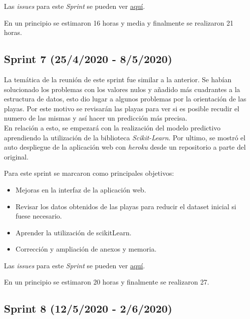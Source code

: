 Las \emph{issues} para este \emph{Sprint} se pueden ver \href{https://github.com/psnti/TFG-Pablo-Santidrian-Tudanca/milestone/6}{aquí}.


En un principio se estimaron 16 horas y media y finalmente se realizaron 21 horas.

\subsection{Sprint 7 (25/4/2020 - 8/5/2020)}\label{Sprint-7}

La temática de la reunión de este sprint fue similar a la anterior. Se habían solucionado los problemas con los valores nulos y añadido más cuadrantes a la estructura de datos, esto dio lugar a algunos problemas por la orientación de las playas. Por este motivo se revisarán las playas para ver si es posible recudir el numero de las mismas y así hacer un predicción más precisa.\\
En relación a esto, se empezará con la realización del modelo predictivo aprendiendo la utilización de la biblioteca \emph{Scikit-Learn}.
Por ultimo, se mostró el auto despliegue de la aplicación web con \emph{heroku} desde un repositorio a parte del original.

Para este sprint se marcaron como principales objetivos:
\begin{itemize}
	\item Mejoras en la interfaz de la aplicación web.
	\item Revisar los datos obtenidos de las playas para reducir el dataset inicial si fuese necesario.
	\item Aprender la utilización de scikitLearn.
	\item Corrección y ampliación de anexos y memoria.
\end{itemize} 

Las \emph{issues} para este \emph{Sprint} se pueden ver \href{https://github.com/psnti/TFG-Pablo-Santidrian-Tudanca/milestone/7}{aquí}.


En un principio se estimaron 20 horas y finalmente se realizaron 27.

\subsection{Sprint 8 (12/5/2020 - 2/6/2020)}\label{Sprint-8}

